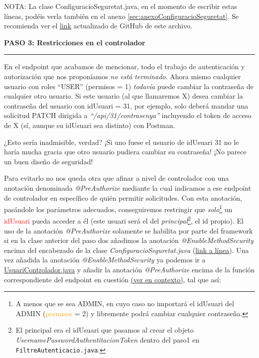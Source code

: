 \documentclass[a4paper,12pt]{report}
\begin{document}
			NOTA: La clase ConfiguracioSeguretat.java, en el momento de escribir estas líneas, podéis verla también en el anexo \ref{sec:anexoConfiguracioSeguretat}. Se recomienda ver el \href{https://github.com/blackcub3s/mercApp/blob/main/APP%20WEB/__springboot__produccio__/app/src/main/java/miApp/app/seguretat/ConfiguracioSeguretat.java}{link} actualizado de GitHub de este archivo.
		
		
		\noindent \textbf{PASO 3: Restricciones en el controlador}
		\hrule
		\vspace{1em}
		
		En el endpoint que acabamos de mencionar, todo el trabajo de autenticación y autorización que nos proponíamos \textit{no está terminado}. Ahora mismo cualquier usuario con roles ``USER'' (permisos = 1) \textit{todavía} puede cambiar la contraseña de cualquier otro usuario. Si este usuario (al que llamaremos X) desea cambiar la contraseña del usuario con idUsuari = 31, por ejemplo, solo deberá mandar una solicitud PATCH dirigida a \textit{``/api/31/contrasenya''} incluyendo el token de acceso de X (sí, aunque su idUsuari sea distinto) con Postman.
		
		¿Esto sería inadmisible, verdad? ¡Si uno fuese el usuario de idUsuari 31 no le haría mucha gracia que otro usuario pudiera cambiar su contraseña! ¡No parece un buen diseño de seguridad!
		
		Para evitarlo no nos queda otra que afinar a nivel de controlador con una anotación denominada \textit{@PreAuthorize} mediante la cual indicamos a ese endpoint de controlador en específico de quién permitir solicitudes. Con esta anotación, pasándole los parámetros adecuados, conseguiremos restringir que \textit{solo}\footnote{A menos que se sea ADMIN, en cuyo caso no importará el idUsuari del ADMIN (\textcolor{orange}{permisos} = 2) y libremente podrá cambiar cualquier contraseña.} un \textcolor{red}{idUsuari} pueda acceder a él (este usuari será el del \textit{principal}\footnote{El principal era el idUsuari que pasamos al crear el objeto \textit{UsernamePasswordAuthentitacionToken} dentro del paso1 en \texttt{FiltreAutenticacio.java}.}, el id propio).  El uso de la anotación \textit{@PreAuthorize} solamente se habilita por parte del framework si en la clase anterior del paso dos añadimos la anotación \textit{@EnableMethodSecurity} encima del encabezado de la clase \textit{ConfiguracioSeguretat.java} (\href{https://github.com/blackcub3s/mercApp/blob/db26ff53664be55223c793cf9b52ade87688be45/APP%20WEB/__springboot__produccio__/app/src/main/java/miApp/app/seguretat/ConfiguracioSeguretat.java#L16}{link a línea}). Una vez añadida la anotación \textit{@EnableMethodSecurity} ya podemos ir a \href{		https://github.com/blackcub3s/mercApp/blob/db26ff53664be55223c793cf9b52ade87688be45/APP%20WEB/__springboot__produccio__/app/src/main/java/miApp/app/Usuaris/controlador/UsuariControlador.java#L263}{UsuariControlador.java} y añadir la anotación \textit{@PreAuthorize} encima de la función correspondiente del endpoint en cuestión \href{https://github.com/blackcub3s/mercApp/blob/db26ff53664be55223c793cf9b52ade87688be45/APP%20WEB/__springboot__produccio__/app/src/main/java/miApp/app/Usuaris/controlador/UsuariControlador.java#L263}{(ver en contexto)}, tal que así:
		
\end{document}
